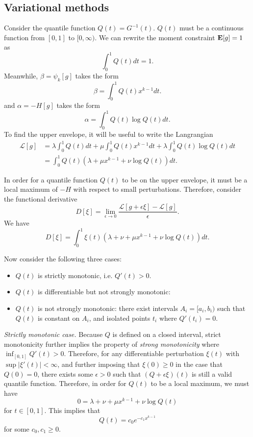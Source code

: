 \documentclass[12pt]{article}
\begin{document}
\subsection{Variational methods}

Consider the quantile function $Q(t) = G^{-1}(t).$  $Q(t)$ must be a continuous function from $[0,1]$ to $[0,\infty).$
We can rewrite the moment constraint $\textbf{E}[g]=1$ as
\[
\int_0^1 Q(t) dt = 1.
\]
Meanwhile, $\beta = \psi_k[g]$ takes the form
\[
\beta = \int_0^1 Q(t) x^{k-1} dt.
\]
and $\alpha = -H[g]$ takes the form
\[
\alpha = \int_0^1 Q(t) \log Q(t) dt.
\]
To find the upper envelope, it will be useful to write the Langrangian
\begin{align*}
\mathcal{L}[g] &= \lambda \int_0^1 Q(t) dt + \mu \int_0^1 Q(t) x^{k-1} dt + \lambda \int_0^1 Q(t) \log Q(t) dt
\\&= \int_0^1 Q(t) (\lambda + \mu x^{k-1} + \nu \log Q(t)) dt.
\end{align*}

In order for a quantile function $Q(t)$ to be on the upper envelope, it must be a local maximum of $-H$ with respect to small perturbations.  Therefore, consider the functional derivative
\[
D[\xi] = \lim_{\epsilon \to 0} \frac{\mathcal{L}[g + \epsilon \xi] - \mathcal{L}[g]}{\epsilon}.
\]
We have
\[
D[\xi] = \int_0^1 \xi(t) (\lambda + \nu  + \mu x^{k-1} + \nu \log Q(t)) dt.
\]

Now consider the following three cases:
\begin{itemize}
\item $Q(t)$ is strictly monotonic, i.e. $Q'(t) > 0.$
\item $Q(t)$ is differentiable but not strongly monotonic: 
\item $Q(t)$ is not strongly monotonic: there exist intervals $A_i = [a_i, b_i)$ such that $Q(t)$ is constant on $A_i$,
and isolated points $t_i$ where $Q'(t_i) = 0.$
\end{itemize}

\emph{Strictly monotonic case.}  Because $Q$ is defined on a closed interval,
strict monotonicity further implies the property of \emph{strong monotonicity} where 
$\inf_[0,1] Q'(t) > 0.$  Therefore, for any differentiable perturbation $\xi(t)$ with $\sup |\xi'(t)| <\infty$,
and further imposing that $\xi(0) \geq 0$ in the case that $Q(0) = 0$,
there exists some $\epsilon >0$ such that $(Q + \epsilon \xi)(t)$ is still a valid quantile function.
Therefore, in order for $Q(t)$ to be a local maximum, we must have
\[
0 = \lambda + \nu  + \mu x^{k-1} + \nu \log Q(t)
\]
for $t \in [0,1]$.  This implies that
\[
Q(t) = c_0 e^{-c_1 x^{k-1}}
\]
for some $c_0, c_1 \geq 0$.
\end{document}
